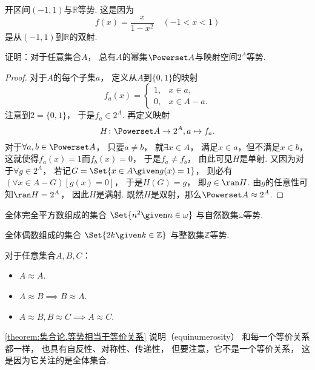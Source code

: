 \begin{example}\label{example:基数.开区间与全体实数等势2}
开区间\((-1,1)\)与\(\mathbb{R}\)等势.
这是因为\begin{equation*}
	f(x) = \frac{x}{1-x^2}
	\quad(-1<x<1)
\end{equation*}是从\((-1,1)\)到\(\mathbb{R}\)的双射.
\end{example}

\begin{example}\label{example:基数.幂集与特征函数空间等势}
证明：对于任意集合\(A\)，
总有\(A\)的幂集\(\Powerset A\)与映射空间\(2^A\)等势.
\begin{proof}
对于\(A\)的每个子集\(a\)，
定义从\(A\)到\(\{0,1\}\)的映射\begin{equation*}
	f_a(x) = \left\{ \begin{array}{cl}
		1, & x \in a, \\
		0, & x \in A - a.
	\end{array} \right.
\end{equation*}
注意到\(2=\{0,1\}\)，
于是\(f_a \in 2^A\).
再定义映射\begin{equation*}
	H\colon \Powerset A \to 2^A,
	a \mapsto f_a.
\end{equation*}
对于\(\forall a,b \in \Powerset A\)，
只要\(a \neq b\)，
就\(\exists x \in A\)，
满足\(x \in a\)，但不满足\(x \in b\)，
这就使得\(f_a(x) = 1\)而\(f_b(x) = 0\)，
于是\(f_a \neq f_b\)，
由此可见\(H\)是单射.
又因为对于\(\forall g \in 2^A\)，
若记\(G = \Set{ x \in A \given g(x) = 1 }\)，
则必有\((\forall x \in A - G)[g(x) = 0]\)，
于是\(H(G) = g\)，
即\(g \in \ran H\).
由\(g\)的任意性可知\(\ran H = 2^A\)，
因此\(H\)是满射.
既然\(H\)是双射，那么\(\Powerset A \approx 2^A\).
\end{proof}
\end{example}

\begin{example}
全体完全平方数组成的集合
\(
	\Set{
		n^2
		\given
		n \in \omega
	}
\)
与自然数集\(\omega\)等势.
\end{example}

\begin{example}
全体偶数组成的集合
\(
	\Set{
		2k
		\given
		k \in \mathbb{Z}
	}
\)
与整数集\(\mathbb{Z}\)等势.
\end{example}

\begin{theorem}\label{theorem:集合论.等势相当于等价关系}
对于任意集合\(A,B,C\)：\begin{itemize}
	\item \(A \approx A\).
	\item \(A \approx B \implies B \approx A\).
	\item \(A \approx B, B \approx C \implies A \approx C\).
\end{itemize}
\end{theorem}
\cref{theorem:集合论.等势相当于等价关系}
说明（equinumerosity）
和每一个等价关系都一样，
也具有自反性、对称性、传递性，
但要注意，它不是一个等价关系，
这是因为它关注的是全体集合.

